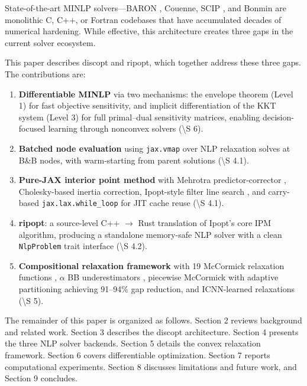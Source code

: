\documentclass[12pt,preprint]{article}
\begin{document}
State-of-the-art MINLP solvers---BARON \cite{Tawarmalani2005}, Couenne, SCIP \cite{Bestuzheva2023}, and Bonmin \cite{Bonami2008} are monolithic C, C++, or Fortran codebases that have accumulated decades of numerical hardening. While effective, this architecture creates three gaps in the current solver ecosystem.


This paper describes discopt and ripopt, which together address these three gaps. The contributions are:


\begin{enumerate}
\item \textbf{Differentiable MINLP} via two mechanisms: the envelope theorem (Level 1) for fast objective sensitivity, and implicit differentiation of the KKT system (Level 3) for full primal--dual sensitivity matrices, enabling decision-focused learning through nonconvex solvers (\textbackslash{}S 6).

\item \textbf{Batched node evaluation} using \texttt{jax.vmap} over NLP relaxation solves at B\&B nodes, with warm-starting from parent solutions (\textbackslash{}S 4.1).

\item \textbf{Pure-JAX interior point method} with Mehrotra predictor-corrector \cite{Mehrotra1992}, Cholesky-based inertia correction, Ipopt-style filter line search \cite{Wachter2006}, and carry-based \texttt{jax.lax.while\_loop} for JIT cache reuse (\textbackslash{}S 4.1).

\item \textbf{ripopt}: a source-level C++ $\to$ Rust translation of Ipopt's core IPM algorithm, producing a standalone memory-safe NLP solver with a clean \texttt{NlpProblem} trait interface (\textbackslash{}S 4.2).

\item \textbf{Compositional relaxation framework} with 19 McCormick relaxation functions \cite{McCormick1976,Tsoukalas2014}, $\alpha$ BB underestimators \cite{Androulakis1995,Adjiman1998}, piecewise McCormick with adaptive partitioning \cite{Castro2015} achieving 91--94\% gap reduction, and ICNN-learned relaxations \cite{Amos2017icnn} (\textbackslash{}S 5).

\end{enumerate}


The remainder of this paper is organized as follows. Section 2 reviews background and related work. Section 3 describes the discopt architecture. Section 4 presents the three NLP solver backends. Section 5 details the convex relaxation framework. Section 6 covers differentiable optimization. Section 7 reports computational experiments. Section 8 discusses limitations and future work, and Section 9 concludes.
\end{document}

